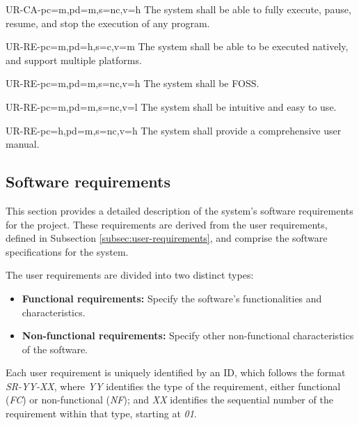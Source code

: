 \begin{userReq}{UR-CA-}{pc=m,pd=m,s=nc,v=h}
  The system shall be able to fully execute, pause, resume, and stop the execution of any program.
\end{userReq}


\setcounter{i}{1}

\begin{userReq}{UR-RE-}{pc=m,pd=h,s=c,v=m}
  The system shall be able to be executed natively, and support multiple platforms.
\end{userReq}

\begin{userReq}{UR-RE-}{pc=m,pd=m,s=nc,v=h}
  The system shall be \gls{FOSS}.
\end{userReq}

\begin{userReq}{UR-RE-}{pc=m,pd=m,s=nc,v=l}
  The system shall be intuitive and easy to use.
\end{userReq}

\begin{userReq}{UR-RE-}{pc=h,pd=m,s=nc,v=h}
  The system shall provide a comprehensive user manual.
\end{userReq}


\FloatBarrier  %


\subsection{Software requirements}\label{subsec:soft-requirements}
This section provides a detailed description of the system's software requirements for the project. These requirements are derived from the user requirements, defined in Subsection \ref{subsec:user-requirements}, and comprise the software specifications for the system.

The user requirements are divided into two distinct types:
\begin{itemize}
  \item \textbf{Functional requirements:} Specify the software's functionalities and characteristics.
  \item \textbf{Non-functional requirements:} Specify other non-functional characteristics of the software.
\end{itemize}

Each user requirement is uniquely identified by an ID, which follows the format \textit{SR-YY-XX}, where \textit{YY} identifies the type of the requirement, either functional (\textit{FC}) or non-functional (\textit{NF}); and \textit{XX} identifies the sequential number of the requirement within that type, starting at \textit{01}.

